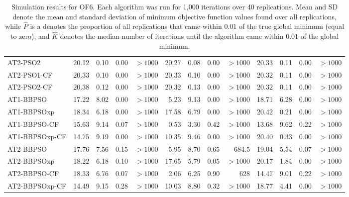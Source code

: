 \documentclass[cmbright]{staauth}
\numberwithin{table}{section}
\begin{document}
\begin{table}[ht]
\begin{tabular}{l|rrrr|rrrr|rrrr}
  AT2-PSO2 & 20.12 & 0.10 & 0.00 & $> 1000$ & 20.27 & 0.08 & 0.00 & $> 1000$ & 20.33 & 0.11 & 0.00 & $> 1000$ \\
  AT2-PSO1-CF & 20.33 & 0.10 & 0.00 & $> 1000$ & 20.33 & 0.10 & 0.00 & $> 1000$ & 20.32 & 0.11 & 0.00 & $> 1000$ \\
  AT2-PSO2-CF & 20.38 & 0.12 & 0.00 & $> 1000$ & 20.32 & 0.13 & 0.00 & $> 1000$ & 20.32 & 0.11 & 0.00 & $> 1000$ \\
   \hline
AT1-BBPSO & 17.22 & 8.02 & 0.00 & $> 1000$ & 5.23 & 9.13 & 0.00 & $> 1000$ & 18.71 & 6.28 & 0.00 & $> 1000$ \\
  AT1-BBPSOxp & 18.34 & 6.18 & 0.00 & $> 1000$ & 17.58 & 6.79 & 0.00 & $> 1000$ & 20.42 & 0.21 & 0.00 & $> 1000$ \\
  AT1-BBPSO-CF & 15.63 & 9.14 & 0.07 & $> 1000$ & 0.53 & 3.30 & 0.42 & $> 1000$ & 13.68 & 9.62 & 0.22 & $> 1000$ \\
  AT1-BBPSOxp-CF & 14.75 & 9.19 & 0.00 & $> 1000$ & 10.35 & 9.46 & 0.00 & $> 1000$ & 20.40 & 0.33 & 0.00 & $> 1000$ \\
   \hline
AT2-BBPSO & 17.76 & 7.56 & 0.15 & $> 1000$ & 5.95 & 8.70 & 0.65 & 684.5 & 19.04 & 5.54 & 0.07 & $> 1000$ \\
  AT2-BBPSOxp & 18.22 & 6.18 & 0.10 & $> 1000$ & 17.65 & 5.79 & 0.05 & $> 1000$ & 20.17 & 1.84 & 0.00 & $> 1000$ \\
  AT2-BBPSO-CF & 18.33 & 6.76 & 0.07 & $> 1000$ & 2.06 & 6.25 & 0.90 & 628 & 14.47 & 9.01 & 0.22 & $> 1000$ \\
  AT2-BBPSOxp-CF & 14.49 & 9.15 & 0.28 & $> 1000$ & 10.03 & 8.80 & 0.32 & $> 1000$ & 18.77 & 4.41 & 0.00 & $> 1000$ \\
   \hline
\end{tabular}
\endgroup
\caption{Simulation results for OF6. Each algorithm was run for 1,000 iterations over 40 replications. Mean and SD denote the mean and standard deviation of minimum objective function values found over all replications, while $\widehat{P}$ is a denotes the proportion of all replications that came within $0.01$ of the true global minimum (equal to zero), and $\widehat{K}$ denotes the median number of iterations until the algorithm came within $0.01$ of the global minimum.}
\label{tab:psosim6}
\end{table}


\end{document}
